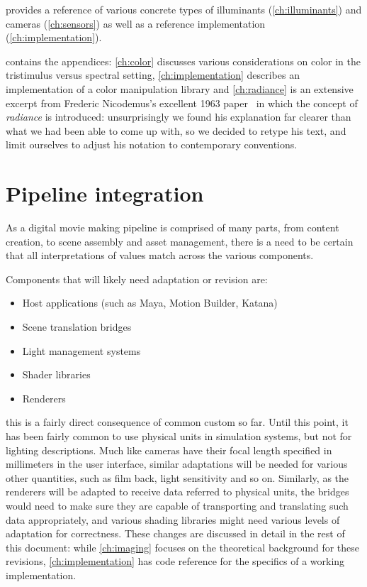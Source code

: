  provides a reference of various concrete types of
illuminants (\cref{ch:illuminants}) and cameras (\cref{ch:sensors})
as well as a reference implementation (\cref{ch:implementation}).

 contains the appendices: \cref{ch:color} discusses
various considerations on color in the tristimulus versus spectral setting,
\cref{ch:implementation} describes an implementation of a color manipulation library
and \cref{ch:radiance} is an extensive excerpt from Frederic Nicodemus's 
excellent 1963 paper~\cite{nicodemus63} in which the concept of \textsl{\gls{radiance}}
is introduced: unsurprisingly we found his explanation far clearer than what we 
had been able to come up with, so we decided to retype his text, and limit ourselves
to adjust his notation to contemporary conventions.

\section{Pipeline integration}

As a digital movie making pipeline is comprised of many parts, from content creation, to
scene assembly and asset management, there is a need to
be certain that all interpretations of values match across the various components.

Components that will likely need adaptation or revision are:

\begin{itemize}
\item Host applications (such as Maya, Motion Builder, Katana)
\item Scene translation bridges
\item Light management systems
\item Shader libraries
\item Renderers
\end{itemize}
this is a fairly direct consequence of common custom so far. Until this point, it has been
fairly common to use physical units in simulation systems, but not for lighting descriptions.
Much like cameras have their focal length specified in millimeters in the user interface,
similar adaptations will be needed for various other quantities, such as film back, light 
sensitivity and so on. Similarly, as the renderers will be adapted to receive data
referred to physical units, the bridges would need to make sure they are capable of transporting
and translating such data appropriately, and various shading libraries might need various levels
of adaptation for correctness. These changes are discussed in detail in the rest of this document:
while \cref{ch:imaging} focuses on the theoretical background for these revisions,
\cref{ch:implementation} has code reference for the specifics of a working implementation.

